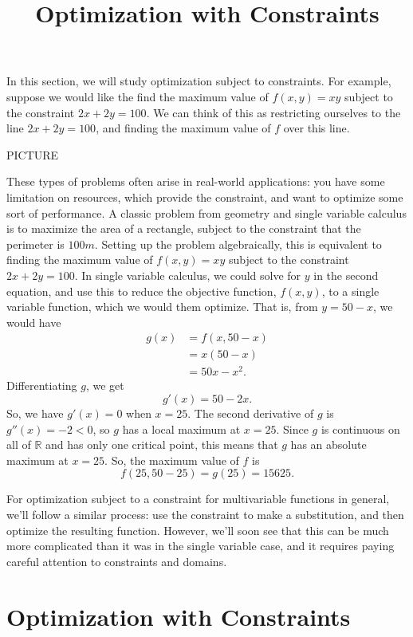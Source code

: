 \documentclass{ximera}
\title{Optimization with Constraints}
\begin{document}
\begin{abstract}
\end{abstract}
\maketitle

In this section, we will study optimization subject to constraints. For example, suppose we would like the find the maximum value of $f(x,y) = xy$ subject to the constraint $2x+2y=100$. We can think of this as restricting ourselves to the line $2x+2y=100$, and finding the maximum value of $f$ over this line.

PICTURE

These types of problems often arise in real-world applications: you have some limitation on resources, which provide the constraint, and want to optimize some sort of performance. A classic problem from geometry and single variable calculus is to maximize the area of a rectangle, subject to the constraint that the perimeter is $100m$. Setting up the problem algebraically, this is equivalent to finding the maximum value of $f(x,y) = xy$ subject to the constraint $2x+2y=100$. In single variable calculus, we could solve for $y$ in the second equation, and use this to reduce the objective function, $f(x,y)$, to a single variable function, which we would them optimize. That is, from $y=50-x$, we would have
\begin{align*}
g(x) &= f(x,50-x)\\
&= x(50-x)\\
&= 50x-x^2.
\end{align*}
Differentiating $g$, we get
\[
g'(x) = 50-2x.
\]
So, we have $g'(x) = 0$ when $x = 25$. The second derivative of $g$ is $g''(x) = -2<0$, so $g$ has a local maximum at $x=25$. Since $g$ is continuous on all of $\mathbb{R}$ and has only one critical point, this means that $g$ has an absolute maximum at $x=25$. So, the maximum value of $f$ is
\[
f(25,50-25) = g(25) = 15625.
\]

For optimization subject to a constraint for multivariable functions in general, we'll follow a similar process: use the constraint to make a substitution, and then optimize the resulting function. However, we'll soon see that this can be much more complicated than it was in the single variable case, and it requires paying careful attention to constraints and domains.

\section*{Optimization with Constraints}
\end{document}
